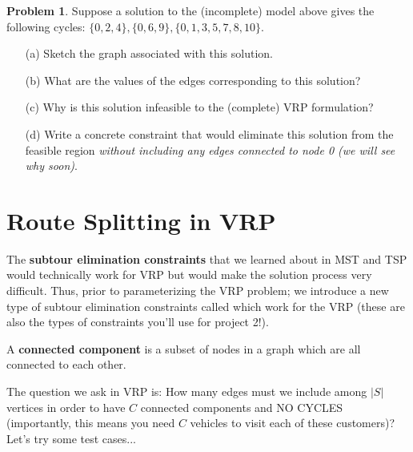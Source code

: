 \documentclass[11pt]{article}
\theoremstyle{definition}
\newtheorem{problem}{Problem}
\begin{document}
\newpage

\begin{problem}
Suppose a solution to the (incomplete) model above  gives the following cycles: $\{0,2,4\}, \{0,6,9\}, \{0,1,3,5,7,8,10\}$.
	\begin{enumerate}
	\item[(a)] Sketch the graph associated with this solution. \vfill
	\item[(b)] What are the values of the edges corresponding to this solution? 
	\vfill
	\item[(c)] Why is this solution infeasible to the (complete) VRP formulation? 
	\vfill
	\item[(d)] Write a concrete constraint that would eliminate this solution from the feasible region \emph{without including any edges connected to node 0 (we will see why soon)}.
	\end{enumerate}
\end{problem}
\vfill
\newpage

\section{Route Splitting in VRP}

The \textbf{subtour elimination constraints} that we learned about in MST and TSP would technically work for VRP but would make the solution process very difficult. Thus, prior to parameterizing the VRP problem; we introduce a new type of subtour elimination constraints called which work for the VRP (these are also the types of constraints you'll use for project 2!).

\begin{tcolorbox}
A \textbf{connected component} is a subset of nodes in a graph which are all connected to each other.
\end{tcolorbox}

The question we ask in VRP is: How many edges must we include among $|S|$ vertices in order to have $C$ connected components and NO CYCLES (importantly, this means you need $C$ vehicles to visit each of these customers)?  Let's try some test cases...
\end{document}
